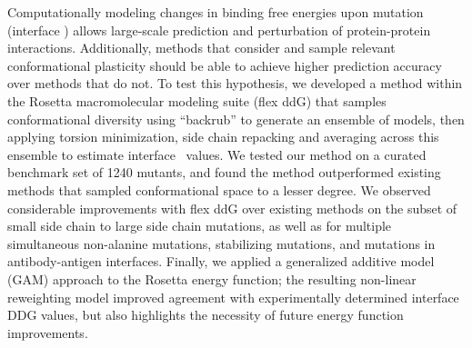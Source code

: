 Computationally modeling changes in binding free energies upon mutation (interface \ddg) allows large-scale prediction and perturbation of protein-protein interactions.
Additionally, methods that consider and sample relevant conformational plasticity should be able to achieve higher prediction accuracy over methods that do not.
To test this hypothesis, we developed a method within the Rosetta macromolecular modeling suite (flex ddG) that samples conformational diversity using ``backrub'' to generate an ensemble of models, then applying torsion minimization, side chain repacking and averaging across this ensemble to estimate interface \ddg\ values.
We tested our method on a curated benchmark set of 1240 mutants, and found the method outperformed existing methods that sampled conformational space to a lesser degree.
We observed considerable improvements with flex ddG over existing methods on the subset of small side chain to large side chain mutations, as well as for multiple simultaneous non-alanine mutations, stabilizing mutations, and mutations in antibody-antigen interfaces.
Finally, we applied a generalized additive model (GAM) approach to the Rosetta energy function; the resulting non-linear reweighting model improved agreement with experimentally determined interface DDG values, but also highlights the necessity of future energy function improvements.